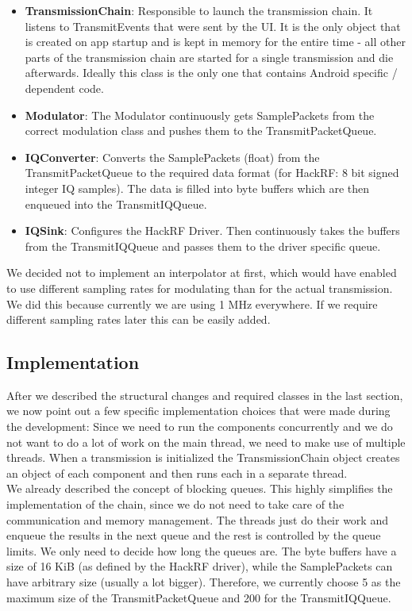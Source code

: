 \begin{itemize}
	\item \textbf{TransmissionChain}: Responsible to launch the transmission chain. It listens to TransmitEvents that were sent by the UI. It is the only object that is created on app startup and is kept in memory for the entire time - all other parts of the transmission chain are started for a single transmission and die afterwards. Ideally this class is the only one that contains Android specific / dependent code. 
	\item \textbf{Modulator}: The Modulator continuously gets SamplePackets from the correct modulation class and pushes them to the TransmitPacketQueue. 
	\item \textbf{IQConverter}: Converts the SamplePackets (float) from the TransmitPacketQueue to the required data format (for HackRF: 8 bit signed integer IQ samples). The data is filled into byte buffers which are then enqueued into the TransmitIQQueue. 
	\item \textbf{IQSink}: Configures the HackRF Driver. Then continuously takes the buffers from the TransmitIQQueue and passes them to the driver specific queue. 
\end{itemize}

We decided not to implement an interpolator at first, which would have enabled to use different sampling rates for modulating than for the actual transmission. We did this because currently we are using 1 MHz everywhere. If we require different sampling rates later this can be easily added. 

\subsection{Implementation}

After we described the structural changes and required classes in the last section, we now point out a few specific implementation choices that were made during the development: 
Since we need to run the components concurrently and we do not want to do a lot of work on the main thread, we need to make use of multiple threads. When a transmission is initialized the TransmissionChain object creates an object of each component and then runs each in a separate thread. \\
We already described the concept of blocking queues. This highly simplifies the implementation of the chain, since we do not need to take care of the communication and memory management. The threads just do their work and enqueue the results in the next queue and the rest is controlled by the queue limits. We only need to decide how long the queues are. The byte buffers have a size of 16 KiB (as defined by the HackRF driver), while the SamplePackets can have arbitrary size (usually a lot bigger). Therefore, we currently choose 5 as the maximum size of the TransmitPacketQueue and 200 for the TransmitIQQueue.  
	
